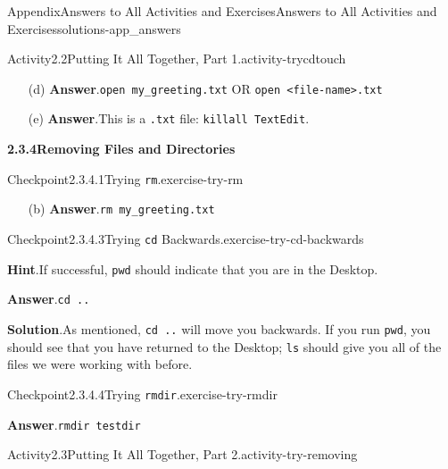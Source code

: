 \documentclass[twoside,10pt,]{book}
\newcommand{\blocktitlefont}{\relax}
\newcommand{\mono}[1]{\texttt{#1}}
\begin{document}
\begin{solutions-chapter}{Appendix}{Answers to All Activities and Exercises}{}{Answers to All Activities and Exercises}{}{}{solutions-app_answers}
\begin{activitysolution}{Activity}{2.2}{Putting It All Together, Part 1.}{activity-trycdtouch}
\begin{enumerate}[font=\bfseries,label=(\alph*),ref=\alph*]
\item[(d)]\noindent\textbf{\blocktitlefont Answer}.\hypertarget{answer-trycdtouch-g-b-back}{}\quad{}\mono{open my\_greeting.txt} OR \mono{open <file-name>.txt}%
\item[(e)]\noindent\textbf{\blocktitlefont Answer}.\hypertarget{answer-trycdtouch-h-b-back}{}\quad{}This is a \mono{.txt} file: \mono{killall TextEdit}.%
\end{enumerate}%
\end{activitysolution}%
\par\medskip
\noindent\textbf{\Large{}2.3.4\space\textperiodcentered\space{}Removing Files and Directories}
\begin{inlinesolution}{Checkpoint}{2.3.4.1}{Trying \mono{rm}.}{exercise-try-rm}%
\begin{enumerate}[font=\bfseries,label=(\alph*),ref=\alph*]%
\item[(b)]\noindent\textbf{\blocktitlefont Answer}.\hypertarget{answer-try-rm-c-b-back}{}\quad{}\mono{rm my\_greeting.txt}%
\end{enumerate}%
\end{inlinesolution}%
\begin{inlinesolution}{Checkpoint}{2.3.4.3}{Trying \mono{cd} Backwards.}{exercise-try-cd-backwards}%
\par\smallskip%
\noindent\textbf{\blocktitlefont Hint}.\hypertarget{hint-try-cd-backwards-c-back}{}\quad{}If successful, \mono{pwd} should indicate that you are in the Desktop.%
\par\smallskip%
\noindent\textbf{\blocktitlefont Answer}.\hypertarget{answer-try-cd-backwards-d-back}{}\quad{}\mono{cd ..}%
\par\smallskip%
\noindent\textbf{\blocktitlefont Solution}.\hypertarget{solution-try-cd-backwards-e-back}{}\quad{}As mentioned, \mono{cd ..} will move you backwards. If you run \mono{pwd}, you should see that you have returned to the Desktop; \mono{ls} should give you all of the files we were working with before.%
\end{inlinesolution}%
\begin{inlinesolution}{Checkpoint}{2.3.4.4}{Trying \mono{rmdir}.}{exercise-try-rmdir}%
\par\smallskip%
\noindent\textbf{\blocktitlefont Answer}.\hypertarget{answer-try-rmdir-c-back}{}\quad{}\mono{rmdir testdir}%
\end{inlinesolution}%
\begin{activitysolution}{Activity}{2.3}{Putting It All Together, Part 2.}{activity-try-removing}%

\end{activitysolution}
\end{solutions-chapter}
\end{document}
